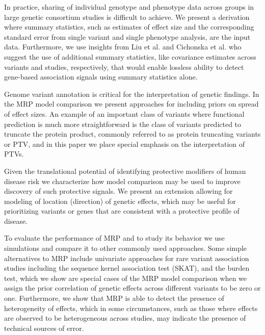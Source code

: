 \documentclass{nature}
\begin{document}
In practice, sharing of individual genotype and phenotype data across groups in large genetic consortium studies is difficult to achieve.  We present a derivation where summary statistics, such as estimates of effect size and the corresponding standard error from single variant and single phenotype analysis, are the input data. Furthermore, we use insights from Liu et al.\cite{liu2014meta} and Cichonska et al.\cite{cichonska2016metacca} who suggest the use of additional summary statistics, like covariance estimates across variants and studies, respectively, that would enable lossless ability to detect gene-based association signals using summary statistics alone.  

Genome variant annotation is critical for the interpretation of genetic findings. In the MRP model comparison we present approaches for including priors on spread of effect sizes. An example of an important class of variants where functional prediction is much more straightforward is the class of variants predicted to truncate the protein product, commonly referred to as protein truncating variants or PTV\cite{rivas2013assessing,rivas2015effect}, and in this paper we place special emphasis on the interpretation of PTVs. 

Given the translational potential of identifying protective modifiers of human disease risk we characterize how model comparison may be used to improve discovery of such protective signals. We present an extension allowing for modeling of location (direction) of genetic effects, which may be useful for prioritizing variants or genes that are consistent with a protective profile of disease\cite{pcsk9,cohen2006sequence,sullivan2012effect}. 

To evaluate the performance of MRP and to study its behavior we use simulations and compare it to other commonly used approaches. Some simple alternatives to MRP include univariate approaches for rare variant association studies including the sequence kernel association test (SKAT)\cite{skat}, and the burden test, which we show are special cases of the MRP model comparison when we assign the prior correlation of genetic effects across different variants to be zero or one. Furthermore, we show that MRP is able to detect the presence of heterogeneity of effects, which in some circumstances, such as those where effects are observed to be heterogeneous across studies, may indicate the presence of technical sources of error. 
  
\end{document}
